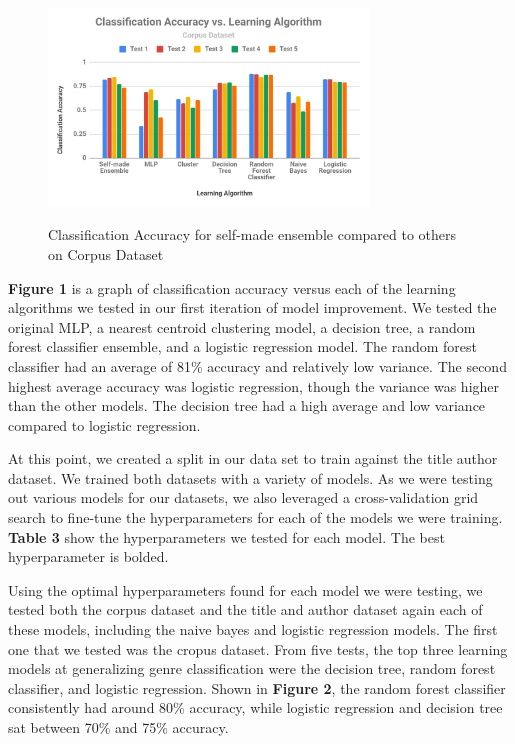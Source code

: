 \documentclass{article}
\begin{document}
\begin{figure}
  \includegraphics[width=8.5cm,height=6cm]{Figure2.JPG}
  \caption{Classification Accuracy for self-made ensemble compared to others on Corpus Dataset}
\end{figure}
\textbf{Figure 1} is a graph of classification accuracy versus each of the learning algorithms we tested in our first iteration of model improvement. We tested the original MLP, a nearest centroid clustering model, a decision tree, a random forest classifier ensemble, and a logistic regression model. The random forest classifier had an average of 81\% accuracy and relatively low variance. The second highest average accuracy was logistic regression, though the variance was higher than the other models. The decision tree had a high average and low variance compared to logistic regression. \par
	At this point, we created a split in our data set to train against the title author dataset. We trained both datasets with a variety of models. As we were testing out various models for our datasets, we also leveraged a cross-validation grid search to fine-tune the hyperparameters for each of the models we were training. \textbf{Table 3} show the hyperparameters we tested for each model. The best hyperparameter is bolded. \par
Using the optimal hyperparameters found for each model we were testing, we tested both the corpus dataset and the title and author dataset again each of these models, including the naive bayes and logistic regression models. The first one that we tested was the cropus dataset. From five tests, the top three learning models at generalizing genre classification were the decision tree, random forest classifier, and logistic regression. Shown in \textbf{Figure 2}, the random forest classifier consistently had around 80\% accuracy, while logistic regression and decision tree sat between 70\% and 75\% accuracy.\par
\end{document}
